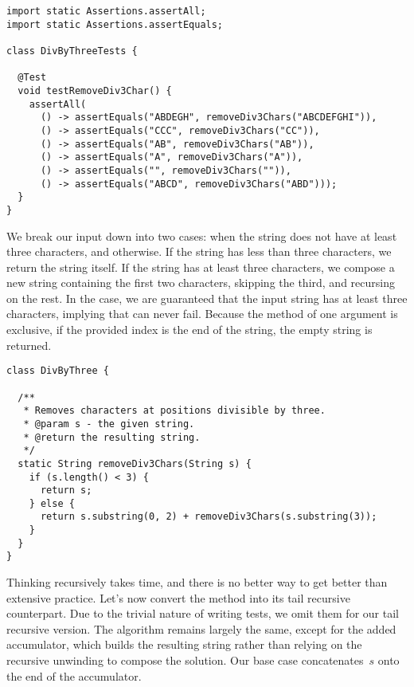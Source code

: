 \begin{lstlisting}[language=MyJava]
import static Assertions.assertAll;
import static Assertions.assertEquals;

class DivByThreeTests {

  @Test
  void testRemoveDiv3Char() {
    assertAll(
      () -> assertEquals("ABDEGH", removeDiv3Chars("ABCDEFGHI")),
      () -> assertEquals("CCC", removeDiv3Chars("CC")),
      () -> assertEquals("AB", removeDiv3Chars("AB")),
      () -> assertEquals("A", removeDiv3Chars("A")),
      () -> assertEquals("", removeDiv3Chars("")),
      () -> assertEquals("ABCD", removeDiv3Chars("ABD")));
  }
}
\end{lstlisting}

We break our input down into two cases: when the string does not have at least three characters, and otherwise. 
If the string has less than three characters, we return the string itself. 
If the string has at least three characters, we compose a new string containing the first two characters, skipping the third, and recursing on the rest. 
In the  case, we are guaranteed that the input string has at least three characters, implying that  can never fail. 
Because the  method of one argument is exclusive, if the provided index is the end of the string, the empty string is returned.

\begin{lstlisting}[language=MyJava]
class DivByThree {

  /**
   * Removes characters at positions divisible by three.
   * @param s - the given string.
   * @return the resulting string.
   */
  static String removeDiv3Chars(String s) {
    if (s.length() < 3) {
      return s;
    } else {
      return s.substring(0, 2) + removeDiv3Chars(s.substring(3));
    }
  }
}
\end{lstlisting}

Thinking recursively takes time, and there is no better way to get better than extensive practice. Let's now convert the method into its tail recursive counterpart. 
Due to the trivial nature of writing tests, we omit them for our tail recursive version. 
The algorithm remains largely the same, except for the added accumulator, which builds the resulting string rather than relying on the recursive unwinding to compose the solution. 
Our base case concatenates~$s$ onto the end of the accumulator.

